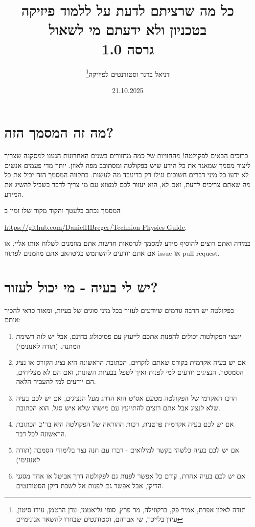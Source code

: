 \documentclass[a4paper,12pt]{article}
\title{כל מה שרציתם לדעת על ללמוד פיזיקה בטכניון ולא ידעתם מי לשאול\\
        \large גרסה 1.0}
\author{דניאל ברגר וסטודנטים לפיזיקה\footnote{תודה לאלון אפרת, אמיר פק, ברקוזילה, מר פרץ, סופי גליאטמן, עדן הרטמן, עידו סיטון, עידן בלייכר, שי אברהם, וסטודנטים שבחרו להשאר אנונימיים}}
\date{21.10.2025}
\begin{document}
\maketitle
\tableofcontents

\newpage

\section{מה זה המסמך הזה?}

ברוכים הבאים לפקולטה! מהחוויות של כמה מחזורים בשנים האחרונות הגענו למסקנה שצריך ליצור מסמך שמאגד את כל הידע שיש בפקולטה ומסתובב מפה לאוזן. יותר מדי פעמים אנשים לא ידעו כל מיני דברים חשובים וגילו רק בדיעבד מה לעשות. בתקווה המסמך הזה יכיל את כל מה שאתם צריכים לדעת, ואם לא, הוא יעזור לכם למצוא עם מי צריך לדבר בשביל להשיג את המידע.

המסמך נכתב בלעטך והקוד מקור שלו זמין ב 

\textenglish{\url{https://github.com/DanielHBreger/Technion-Physics-Guide}}.

במידה ואתם רוצים להוסיף מידע למסמך לגרסאות חדשות אתם מוזמנים לשלוח אותו אליי, או אם אתם יודעים להשתמש בגיטהאב אתם מוזמנים לפתוח \textenglish{issue} או \textenglish{pull request}.

\section{יש לי בעיה - מי יכול לעזור?}

בפקולטה יש הרבה גורמים שיודעים לעזור בכל מיני סוגים של בעיות, ומאוד כדאי להכיר אותם:

\begin{enumerate}
    \item יועצי הפקולטות יכולים להפנות אתכם לייעוץ עם פסיכולוג בחינם, אבל יש לזה רשימת המתנה. (תודה לאנונימי)
    \item אם יש בעיה אקדמית בקורס שאתם לוקחים, הכתובת הראשונה היא נציג הקורס או נציג הסמסטר. הנציגים יודעים למי לפנות ואיך לטפל בבעיות השונות, ואם הם לא מצליחים, הם יודעים למי להעביר הלאה.
    \item הרכז האקדמי של הפקולטה מטעם אס"ט הוא הדרג מעל הנציגים, אם יש לכם בעיה שלא לנציג אבל אתם רוצים להתייעץ עם מישהו שלא איש סגל, הוא הכתובת.
    \item אם יש לכם בעיה אקדמית פרטנית, רכזת ההוראה של הפקולטה היא בד"כ הכתובת הראשונה לכל דבר. 
    \item אם יש לכם בעיה כלשהי בקשר למילואים - דברו עם חנה נצר בלימודי הסמכה (תודה לאנונימי)
    \item אם יש לכם בעיה אחרת, קודם כל אפשר לפנות גם לפקולטה דרך אביטל או אחד מסגני הדיקן, אבל אפשר גם לפנות אל לשכת דיקן הסטודנטים.
\end{enumerate}
\end{document}
